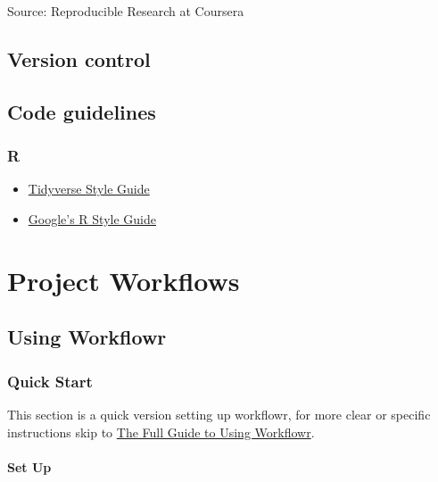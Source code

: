 \documentclass[openany]{article}
\providecommand{\tightlist}{%
  \setlength{\itemsep}{0pt}\setlength{\parskip}{0pt}}
\let\oldparagraph\paragraph
\renewcommand{\paragraph}[1]{\oldparagraph{#1}\mbox{}}
\begin{document}
Source: Reproducible Research at Coursera

\hypertarget{version-control}{%
\subsection{Version control}\label{version-control}}

\hypertarget{code-guidelines}{%
\subsection{Code guidelines}\label{code-guidelines}}

\hypertarget{r}{%
\subsubsection{R}\label{r}}

\begin{itemize}
\tightlist
\item
  \href{https://style.tidyverse.org}{Tidyverse Style Guide}
\item
  \href{https://google.github.io/styleguide/Rguide.xml}{Google's R Style Guide}
\end{itemize}

\hypertarget{workflows}{%
\section{Project Workflows}\label{workflows}}

\hypertarget{using-workflowr}{%
\subsection{Using Workflowr}\label{using-workflowr}}

\hypertarget{quick-start}{%
\subsubsection{Quick Start}\label{quick-start}}

This section is a quick version setting up workflowr, for more clear or specific instructions skip to \protect\hyperlink{the-full-guide-to-using-workflowr}{The Full Guide to Using Workflowr}.

\hypertarget{set-up}{%
\paragraph{Set Up}\label{set-up}}
\end{document}
